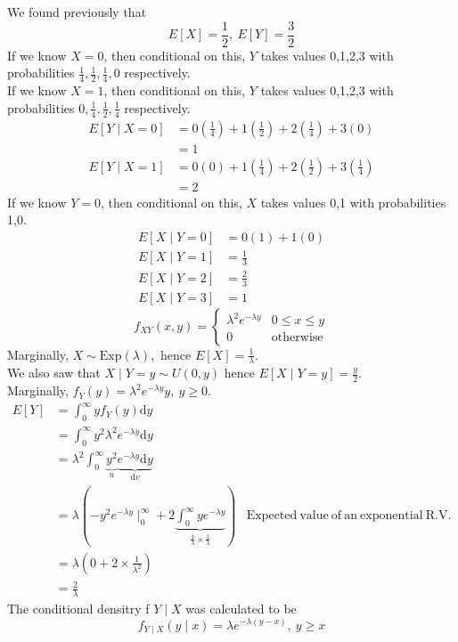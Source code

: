 \documentclass{article}
\theoremstyle{definition}
\theoremstyle{remark}
\theoremstyle{example}
\renewcommand{\d}{\mathrm{d}}
\newcommand{\Exp}{\mathrm{Exp}}
\begin{document}
	We found previously that \[E[X]=\frac{1}{2},\ E[Y]=\frac{3}{2}\]
	If we know $X=0$, then conditional on this, $Y$ takes values 0,1,2,3 with probabilities $\frac14,\frac12, \frac14,0$ respectively.\\
	If we know $X=1$, then conditional on this, $Y$ takes values 0,1,2,3 with probabilities $0,\frac14,\frac12,\frac14$ respectively.
	\begin{align*}
		E[Y \mid X = 0]&=0\left(\frac14\right)+1\left(\frac12\right) + 2\left(\frac14\right)+3\left(0\right)\\
		&=1\\
		E[Y \mid X = 1]&=0\left(0\right)+1\left(\frac14\right)+2\left(\frac12\right)+3 \left(\frac14\right)\\
		&=2
	\end{align*}
	If we know $Y=0$, then conditional on this, $X$ takes values 0,1 with probabilities 1,0.
	\begin{align*}
		E[X \mid Y = 0] &= 0(1)+1(0)\\
		E[X \mid Y = 1] &= \frac13\\
		E[X \mid Y = 2] & = \frac23\\
		E[X \mid Y = 3] & = 1
	\end{align*}
	\[f_{XY}(x,y)=\begin{cases}
		\lambda^2e^{-\lambda y} & 0 \leq x \leq y\\
		0 & \mathrm{otherwise}
	\end{cases}\]
	Marginally, $X \sim \Exp(\lambda),$ hence $E[X]=\frac1\lambda$.\\
	We also saw that $X \mid Y = y \sim U(0,y)$ hence $E[X \mid Y=y]=\frac{y}{2}$.\\
	Marginally, $f_Y(y)=\lambda^2e^{-\lambda y}y,\ y \geq 0$.
	\begin{align*}
		E[Y] &= \int_{0}^{\infty}yf_Y(y) \d y\\
		&= \int_{0}^{\infty}y^2 \lambda^2 e^{- \lambda y} \d y\\
		&= \lambda^2 \int_{0}^{\infty} \underbrace{y^2}_u \underbrace{e^{- \lambda y} \d y}_{\d v}\\
		&= \lambda \left( -y^2 e^{- \lambda y} \mid_0^\infty + 2 \underbrace{\int_{0}^{\infty} y e^{- \lambda y}}_{\frac1\lambda \times \frac1\lambda} \right) & \mathrm{Expected\ value\ of\ an\ exponential\ R.V.}\\
		&= \lambda\left( 0+2 \times \frac1{\lambda^2} \right)\\
		&= \frac2\lambda
	\end{align*}
	The conditional densitry f $Y \mid X$ was calculated to be \[f_{Y \mid X}(y \mid x)=\lambda e^{- \lambda(y-x)},\ y \geq x\]
\end{document}
